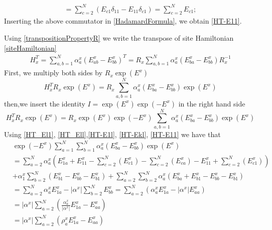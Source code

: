 \documentclass[11pt]{article}
\numberwithin{equation}{section}
\numberwithin{equation}{subsection}
\begin{document}
\begin{enumerate}
\begin{align*}
[E,E_{11}]=\sum_{c=2}^{N}\left(E_{c1}\delta_{11}-E_{1 1}\delta_{c1}\right)=\sum_{c=2}^{N}E_{c1};
\end{align*}
  Inserting the above commutator in \eqref{HadamardFormula}, we obtain \eqref{HT-E11}.
\end{enumerate}
Using \eqref{transpositionPropertyR} we write the transpose of site Hamiltonian \eqref{siteHamiltonian} 
\begin{equation}
    \begin{split}
H_{x}^{T}=\sum_{a,b=1}^{N}\alpha_{a}^{x}\left(E_{ab}^{x}-E_{bb}^{x}\right)^{T}=R_{x}\sum_{a,b=1}^{N}\alpha_{a}^{x}\left(E_{b a}^{x}-E_{bb}^{x}\right)R_{x}^{-1}
    \end{split}
\end{equation}
First, we multiply both sides by $R_{x}\exp{(E^{x})}$
\begin{equation}
    H_{x}^{T}R_{x}\exp{(E^{x})}=R_{x}\sum_{a,b =1}^{N}\alpha_{a}^{x}\left(E_{b a}^{x}-E_{bb}^{x}\right)\exp{(E^{x})}
\end{equation}
then,we insert the identity $I=\exp{(E^{x})}\exp{(-E^{x})}$ in the right hand side
\begin{equation}\label{intermediateTransposeSite}
H_{x}^{T}R_{x}\exp{(E^{x})}=R_{x}\exp{(E^{x})}\exp{(-E^{x})}\sum_{a,b=1}^{N}\alpha_{a}^{x}\left(E_{b a}^{x}-E_{bb}^{x}\right)\exp{(E^{x})}
\end{equation}
 Using \eqref{HT_El1}, \eqref{HT_Ell},\eqref{HT-E1l}, \eqref{HT-Ekl}, \eqref{HT-E11} we have that 
\begin{align}
    &\exp{(-E^{x})}\sum_{a=1}^{N}\sum_{b=1}^{N}\alpha_{a}^{x}\left(E_{b a}^{x}-E_{bb}^{x}\right)\exp{(E^{x})}\nonumber
    \\&=\nonumber
    \sum_{a=2}^{N}\alpha_{a}^{x}\left(E_{1a}^{x}+E_{11}^{x}-\sum_{c=2}^{N}(E_{c1}^{x})-\sum_{c=2}^{N}(E_{ca}^{x})-E_{11}^{x}+
    \sum_{c=2}^{N}(E_{c1}^{x})\right)
    \\&+\nonumber
    \alpha_{1}^{x}\sum_{b=2}^{N}\left(E_{b1}^{x}-E_{bb}^{x}-E_{b1}^{x}\right)+\sum_{a=2}^{N}\sum_{b=2}^{N}\alpha_{a}^{x}\left(E_{ba}^{x}+E_{b1}^{x}-E_{bb}^{x}-E_{b1}^{x}\right)
    \\&=\nonumber
    \sum_{a=2}^{N}\alpha_{a}^{x}E_{1a}^{x}-|\alpha^{x}|\sum_{b=2}^{N}E_{bb}^{x}=
    \sum_{a=2}^{N}\left(\alpha_{a}^{x}E_{1a}^{x}-|\alpha^{x}|E_{aa}^{x}\right)
    \\&=\nonumber
    |\alpha^{x}|\sum_{a=2}^{N}\left(\frac{\alpha_{a}^{x}}{|\alpha^{x}|}E_{1a}^{x}-E_{aa}^{x}\right)
    \\&=
    |\alpha^{x}|\sum_{a=2}^{N}\left(\rho_{a}^{x}E_{1a}^{x}-E_{aa}^{x}\right)
 \end{align}
\end{document}
